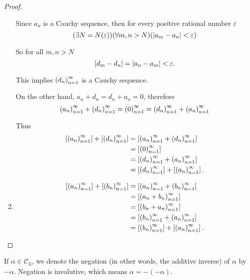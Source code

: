 \begin{proof}
\begin{enumerate}[label={(F\arabic*)},itemsep=0pt]
              Since $a_{n}$ is a Cauchy sequence, then for every positive rational number $\varepsilon$
              \[
                  (\exists N=N(\varepsilon))(\forall m, n > N)(\left\vert{a_{m} - a_{n}}\right\vert < \varepsilon)
              \]

              So for all $m, n > N$
              \[
                  \left\vert{d_{m} - d_{n}}\right\vert = \left\vert{a_{n} - a_{m}}\right\vert < \varepsilon.
              \]

              This implies ${\left({d_{n}}\right)}^{\infty}_{n=1}$ is a Cauchy sequence.

              On the other hand, $a_{n} + d_{n} = d_{n} + a_{n} = 0$, therefore
              \[
                  {\left({a_{n}}\right)}^{\infty}_{n=1} + {\left({d_{n}}\right)}^{\infty}_{n=1} = {\left({0}\right)}^{\infty}_{n=1} = {\left({d_{n}}\right)}^{\infty}_{n=1} + {\left({a_{n}}\right)}^{\infty}_{n=1}
              \]

              Thus
              \begin{align*}
                  \left[{{\left({a_{n}}\right)}^{\infty}_{n=1}}\right] + \left[{{\left({d_{n}}\right)}^{\infty}_{n=1}}\right] & = \left[{{\left({a_{n}}\right)}^{\infty}_{n=1} + {\left({d_{n}}\right)}^{\infty}_{n=1}}\right]          \\
                                                            & = \left[{{\left({0}\right)}^{\infty}_{n=1}}\right]                            \\
                                                            & = \left[{{\left({d_{n}}\right)}^{\infty}_{n=1} + {\left({a_{n}}\right)}^{\infty}_{n=1}}\right]          \\
                                                            & = \left[{{\left({d_{n}}\right)}^{\infty}_{n=1}}\right] + \left[{{\left({a_{n}}\right)}^{\infty}_{n=1}}\right].
              \end{align*}
        \item \begin{align*}
                  \left[{{\left({a_{n}}\right)}^{\infty}_{n=1}}\right] + \left[{{\left({b_{n}}\right)}^{\infty}_{n=1}}\right] & = \left[{{\left({a_{n}}\right)}^{\infty}_{n=1} + {\left({b_{n}}\right)}^{\infty}_{n=1}}\right]                  \\
                                                            & = \left[{{\left({a_{n} + b_{n}}\right)}^{\infty}_{n=1}}\right]                        \\
                                                            & = \left[{{\left({b_{n} + a_{n}}\right)}^{\infty}_{n=1}}\right]                        \\
                                                            & = \left[{{\left({b_{n}}\right)}^{\infty}_{n=1} + {\left({a_{n}}\right)}^{\infty}_{n=1}}\right]                  \\
                                                            & = \left[{{\left({b_{n}}\right)}^{\infty}_{n=1}}\right] + \left[{{\left({a_{n}}\right)}^{\infty}_{n=1}}\right].\qedhere
              \end{align*}
    \end{enumerate}
\end{proof}

If $\alpha\in\mathscr{C}_{\mathbb{Q}}$, we denote the negation (in other words, the additive inverse) of $\alpha$ by $-\alpha$. Negation is involutive, which means $\alpha = -(-\alpha)$.

